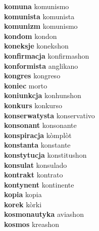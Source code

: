 \textbf{komuna } komunismo \\
\textbf{komunista } komunista \\
\textbf{komunizm } komunismo \\
\textbf{kondom } kondon \\
\textbf{koneksje } konekshon \\
\textbf{konfirmacja } konfirmashon \\
\textbf{konformista } anglikano \\
\textbf{kongres } kongreso \\
\textbf{koniec } morto \\
\textbf{koniunkcja } konhunshon \\
\textbf{konkurs } konkurso \\
\textbf{konserwatysta } konservativo \\
\textbf{konsonant } konsonante \\
\textbf{konspiracja } kòmplòt \\
\textbf{konstanta } konstante \\
\textbf{konstytucja } konstitushon \\
\textbf{konsulat } konsulado \\
\textbf{kontrakt } kontrato \\
\textbf{kontynent } kontinente \\
\textbf{kopia } kopia \\
\textbf{korek } kòrki \\
\textbf{kosmonautyka } aviashon \\
\textbf{kosmos } kreashon \\
